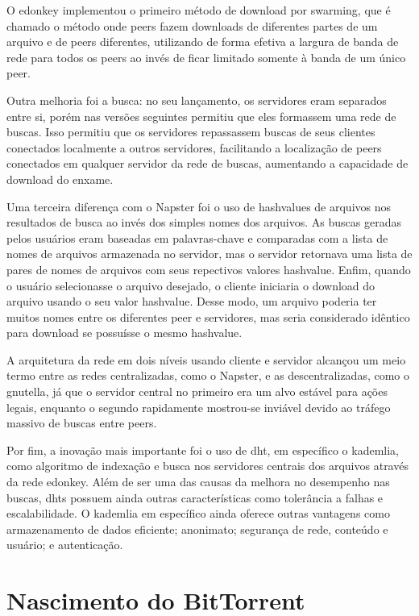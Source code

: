 O \gls*{edonkey} implementou o primeiro método de download por \gls{swarming}, que é
chamado o método onde \glspl*{peer} fazem downloads de diferentes partes de um arquivo e
de \glspl*{peer} diferentes, utilizando de forma efetiva a largura de banda de rede
para todos os \glspl*{peer} ao invés de ficar limitado somente à banda de um único
\gls*{peer}.

Outra melhoria foi a busca: no seu lançamento, os servidores eram separados entre si,
porém nas versões seguintes permitiu que eles formassem uma rede de buscas. Isso
permitiu que os servidores repassassem buscas de seus clientes conectados localmente a
outros servidores, facilitando a localização de \glspl*{peer} conectados em qualquer
servidor da rede de buscas, aumentando a capacidade de download do enxame.

Uma terceira diferença com o Napster foi o uso de \glspl{hashvalue} de arquivos
nos resultados de busca ao invés dos simples nomes dos arquivos. As buscas geradas
pelos usuários eram baseadas em palavras-chave e comparadas com a lista de nomes de
arquivos armazenada no servidor, mas o servidor retornava uma lista de pares de nomes
de arquivos com seus repectivos valores \gls*{hashvalue}. Enfim, quando o usuário
selecionasse o arquivo desejado, o cliente iniciaria o download do arquivo usando o seu
valor \gls*{hashvalue}. Desse modo, um arquivo poderia ter muitos nomes entre os
diferentes \gls*{peer} e servidores, mas seria considerado idêntico para download se
possuísse o mesmo \gls*{hashvalue}.

A arquitetura da rede em dois níveis usando cliente e servidor alcançou um meio termo
entre as redes centralizadas, como o Napster, e as descentralizadas, como o
\gls*{gnutella}, já que o servidor central no primeiro era um alvo estável para ações
legais, enquanto o segundo rapidamente mostrou-se inviável devido ao tráfego massivo de
buscas entre \glspl*{peer}.

Por fim, a inovação mais importante foi o uso de \gls{dht}, em específico o
\gls{kademlia}, como algoritmo de indexação e busca nos servidores centrais dos
arquivos através da rede \gls*{edonkey}. Além de ser uma das causas da melhora no
desempenho nas buscas, \glspl*{dht} possuem ainda outras características como
tolerância a falhas e escalabilidade. O \gls*{kademlia} em específico ainda oferece
outras vantagens como armazenamento de dados eficiente; anonimato; segurança de rede,
conteúdo e usuário; e autenticação.

\section{Nascimento do BitTorrent}

